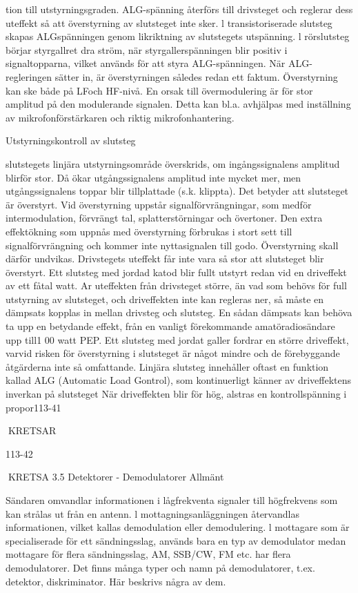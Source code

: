 {{{tion till utstyrningsgraden. ALG-spänning
återförs till drivsteget och reglerar dess uteffekt så att överstyrning av slutsteget inte
sker. l transistoriserade slutsteg skapas ALGspänningen genom likriktning av slutstegets
utspänning. l rörslutsteg börjar styrgallret
dra ström, när styrgallerspänningen blir positiv i signaltopparna, vilket används för att
styra ALG-spänningen. När ALG-regleringen
sätter in, är överstyrningen således redan ett
faktum. Överstyrning kan ske både på LFoch HF-nivå.
En orsak till övermodulering är för stor
amplitud på den modulerande signalen. Detta
kan bl.a. avhjälpas med inställning av
mikrofonförstärkaren och riktig mikrofonhantering.

Utstyrningskontroll av slutsteg

slutstegets linjära utstyrningsområde överskrids, om ingångssignalens amplitud blirför
stor. Då ökar utgångssignalens amplitud inte
mycket mer, men utgångssignalens toppar
blir tillplattade (s.k. klippta). Det betyder att
slutsteget är överstyrt.
Vid överstyrning uppstår signalförvrängningar, som medför intermodulation, förvrängt tal, splatterstörningar och övertoner.
Den extra effektökning som uppnås med
överstyrning förbrukas i stort sett till signalförvrängning och kommer inte nyttasignalen
till godo. Överstyrning skall därför undvikas.
Drivstegets uteffekt får inte vara så stor
att slutsteget blir överstyrt. Ett slutsteg med
jordad katod blir fullt utstyrt redan vid en
driveffekt av ett fåtal watt. Ar uteffekten från
drivsteget större, än vad som behövs för full
utstyrning av slutsteget, och driveffekten inte
kan regleras ner, så måste en dämpsats
kopplas in mellan drivsteg och slutsteg. En
sådan dämpsats kan behöva ta upp en betydande effekt, från en vanligt förekommande
amatöradiosändare upp till1 00 watt PEP.
Ett slutsteg med jordat galler fordrar en
större driveffekt, varvid risken för överstyrning i slutsteget är något mindre och de
förebyggande åtgärderna inte så omfattande.
Linjära slutsteg innehåller oftast en funktion kallad ALG (Automatic Load Gontrol),
som kontinuerligt känner av driveffektens
inverkan på slutsteget När driveffekten blir
för hög, alstras en kontrollspänning i propor113-41

KRETSAR

113-42

KRETSA
3.5 Detektorer - Demodulatorer
Allmänt

Sändaren omvandlar informationen i lågfrekventa signaler till högfrekvens som kan
strålas ut från en antenn. l mottagningsanläggningen återvandlas informationen, vilket kallas demodulation eller demodulering.
l mottagare som är specialiserade för ett
sändningsslag, används bara en typ av demodulator medan mottagare för flera sändningsslag, AM, SSB/CW, FM etc. har flera
demodulatorer. Det finns många typer och
namn på demodulatorer, t.ex. detektor, diskriminator. Här beskrivs några av dem.

}}}
